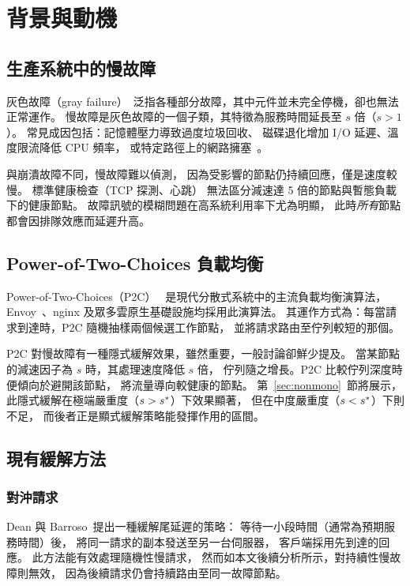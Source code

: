 \section{背景與動機}
\label{sec:background}

\subsection{生產系統中的慢故障}

灰色故障（gray failure）~\cite{huang2017gray}泛指各種部分故障，其中元件並未完全停機，卻也無法正常運作。
慢故障是灰色故障的一個子類，其特徵為服務時間延長至 $s$ 倍（$s > 1$）。
常見成因包括：記憶體壓力導致過度垃圾回收、
磁碟退化增加 I/O 延遲、溫度限流降低 CPU 頻率，
或特定路徑上的網路擁塞~\cite{gunawi2018fail}。

與崩潰故障不同，慢故障難以偵測，
因為受影響的節點仍持續回應，僅是速度較慢。
標準健康檢查（TCP 探測、心跳）
無法區分減速達 5 倍的節點與暫態負載下的健康節點。
故障訊號的模糊問題在高系統利用率下尤為明顯，
此時\emph{所有}節點都會因排隊效應而延遲升高。

\subsection{Power-of-Two-Choices 負載均衡}

Power-of-Two-Choices（P2C）~\cite{mitzenmacher2001power}
是現代分散式系統中的主流負載均衡演算法，
Envoy~\cite{envoy}、nginx 及眾多雲原生基礎設施均採用此演算法。
其運作方式為：每當請求到達時，P2C 隨機抽樣兩個候選工作節點，
並將請求路由至佇列較短的那個。

P2C 對慢故障有一種隱式緩解效果，雖然重要，一般討論卻鮮少提及。
當某節點的減速因子為 $s$ 時，其處理速度降低 $s$ 倍，
佇列隨之增長。P2C 比較佇列深度時便傾向於避開該節點，
將流量導向較健康的節點。
第~\ref{sec:nonmono}~節將展示，
此隱式緩解在極端嚴重度（$s > s^{*}$）下效果顯著，
但在中度嚴重度（$s < s^{*}$）下則不足，
而後者正是顯式緩解策略能發揮作用的區間。

\subsection{現有緩解方法}

\subsubsection*{對沖請求}

Dean 與 Barroso~\cite{dean2013tail}提出一種緩解尾延遲的策略：
等待一小段時間（通常為預期服務時間）後，
將同一請求的副本發送至另一台伺服器，
客戶端採用先到達的回應。
此方法能有效處理隨機性慢請求，
然而如本文後續分析所示，對持續性慢故障則無效，
因為後續請求仍會持續路由至同一故障節點。

